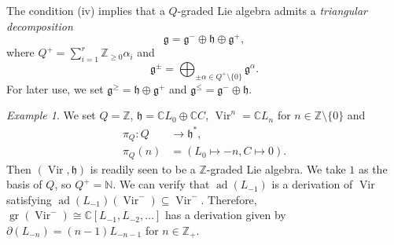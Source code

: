 \documentclass[a4paper, 12pt, reqno]{amsart}
\theoremstyle{remark}
\newtheorem{example}[theorem]{Example}
\DeclareMathOperator{\Vir}{Vir}
\DeclareMathOperator{\gr}{gr}
\DeclareMathOperator{\ad}{ad}
\begin{document}
The condition (iv) implies that a $Q$-graded Lie algebra admits a \emph{triangular decomposition}
\begin{equation*}
  \mathfrak{g} = \mathfrak{g}^- \oplus \mathfrak{h} \oplus \mathfrak{g}^+,
\end{equation*}
where $Q^+ = \sum_{i = 1}^r\mathbb{Z}_{\ge 0}\alpha_i$ and
\begin{equation*}
  \mathfrak{g}^{\pm} = \bigoplus_{\pm \alpha \in Q^+ \setminus \{0\}}\mathfrak{g}^{\alpha}.
\end{equation*}
For later use, we set $\mathfrak{g}^{\ge} = \mathfrak{h} \oplus \mathfrak{g}^+$ and $\mathfrak{g}^{\le} = \mathfrak{g}^- \oplus \mathfrak{h}$.

\begin{example}
  \label{exa:2}
  We set $Q = \mathbb{Z}$, $\mathfrak{h} = \mathbb{C}L_0 \oplus \mathbb{C}C$, $\Vir^n = \mathbb{C}L_n$ for $n \in \mathbb{Z} \setminus \{0\}$ and
  \begin{align*}
    \pi_Q: Q &\to \mathfrak{h}^*, \\
    \pi_Q(n) &= (L_0 \mapsto -n, C \mapsto 0).
  \end{align*}
  Then $(\Vir, \mathfrak{h})$ is readily seen to be a $\mathbb{Z}$-graded Lie algebra.
  We take $1$ as the basis of $Q$, so $Q^+ = \mathbb{N}$.
  We can verify that $\ad(L_{-1})$ is a derivation of $\Vir$ satisfying $\ad(L_{-1})(\Vir^-) \subseteq \Vir^-$.
  Therefore, $\gr(\Vir^-) \cong \mathbb{C}[L_{-1}, L_{-2}, \dots]$ has a derivation given by $\partial(L_{-n}) = (n - 1)L_{-n - 1}$ for $n \in \mathbb{Z}_+$.
\end{example}
\end{document}
